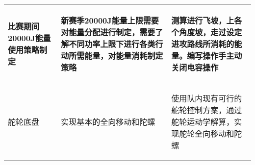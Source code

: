 \begin{longtable}{ p{2cm} | p{7.8cm} | p{6cm} |}
    \hline
    
        \begin{center}
            比赛期间20000J能量使用策略制定
        \end{center} &
        \begin{center}
            新赛季20000J能量上限需要对能量分配进行制定，需要了解不同功率上限下进行各类行动所需能量，对能量消耗制定策略
        \end{center} &
        \begin{center}
            测算进行飞坡，上各个角度坡，走过设定进攻路线所消耗的能量。编写操作手主动关闭电容操作
        \end{center} \\
        
    \hline
    
        \begin{center}
            舵轮底盘
        \end{center} &
        \begin{center}
            实现基本的全向移动和陀螺
        \end{center} &
        \begin{center}
            使用队内现有可行的舵轮控制方案，通过舵轮运动学解算，实现舵轮全向移动和陀螺
        \end{center} \\
        
    \hline
    
\end{longtable}
